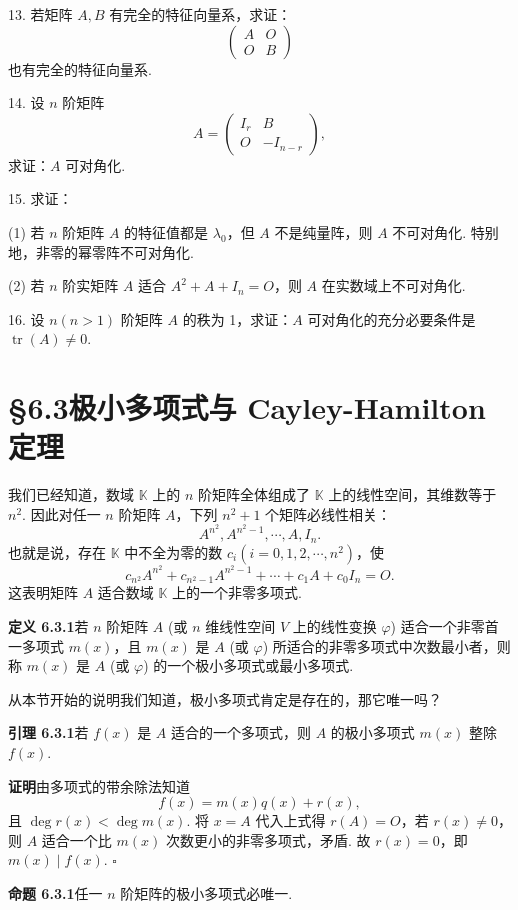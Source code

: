 \documentclass[UTF8, 12pt, fontset=fandol, oneside]{ctexart}
\begin{document}
13. 若矩阵 $A,B$ 有完全的特征向量系，求证：
\[
\left(\begin{array}{cc}
A & O\\
O & B
\end{array}\right)
\]
也有完全的特征向量系.

14. 设 $n$ 阶矩阵
\[
A=\left(\begin{array}{cc}
I_r & B\\
O & -I_{n-r}
\end{array}\right),
\]
求证：$A$ 可对角化.

15. 求证：

(1) 若 $n$ 阶矩阵 $A$ 的特征值都是 $\lambda_0$，但 $A$ 不是纯量阵，则 $A$ 不可对角化. 特别地，非零的幂零阵不可对角化.

(2) 若 $n$ 阶实矩阵 $A$ 适合 $A^2+A+I_n=O$，则 $A$ 在实数域上不可对角化.

16. 设 $n(n>1)$ 阶矩阵 $A$ 的秩为 1，求证：$A$ 可对角化的充分必要条件是 $\operatorname{tr}(A)\neq 0$.

\section*{§6.3\quad 极小多项式与 Cayley-Hamilton 定理}

我们已经知道，数域 $\mathbb{K}$ 上的 $n$ 阶矩阵全体组成了 $\mathbb{K}$ 上的线性空间，其维数等于 $n^2$. 因此对任一 $n$ 阶矩阵 $A$，下列 $n^2+1$ 个矩阵必线性相关：
\[
A^{n^2},A^{n^2-1},\cdots,A,I_n.
\]
也就是说，存在 $\mathbb{K}$ 中不全为零的数 $c_i(i=0,1,2,\cdots,n^2)$，使
\[
c_{n^2}A^{n^2}+c_{n^2-1}A^{n^2-1}+\cdots+c_1A+c_0I_n=O.
\]
这表明矩阵 $A$ 适合数域 $\mathbb{K}$ 上的一个非零多项式.

\noindent\textbf{定义 6.3.1}\quad 若 $n$ 阶矩阵 $A$ (或 $n$ 维线性空间 $V$ 上的线性变换 $\varphi$) 适合一个非零首一多项式 $m(x)$，且 $m(x)$ 是 $A$ (或 $\varphi$) 所适合的非零多项式中次数最小者，则称 $m(x)$ 是 $A$ (或 $\varphi$) 的一个极小多项式或最小多项式.

从本节开始的说明我们知道，极小多项式肯定是存在的，那它唯一吗？

\noindent\textbf{引理 6.3.1}\quad 若 $f(x)$ 是 $A$ 适合的一个多项式，则 $A$ 的极小多项式 $m(x)$ 整除 $f(x)$.

\noindent\textbf{证明}\quad 由多项式的带余除法知道
\[
f(x)=m(x)q(x)+r(x),
\]
且 $\deg r(x)<\deg m(x)$. 将 $x=A$ 代入上式得 $r(A)=O$，若 $r(x)\neq 0$，则 $A$ 适合一个比 $m(x)$ 次数更小的非零多项式，矛盾. 故 $r(x)=0$，即 $m(x)\mid f(x)$. $\square$

\noindent\textbf{命题 6.3.1}\quad 任一 $n$ 阶矩阵的极小多项式必唯一.
\end{document}
